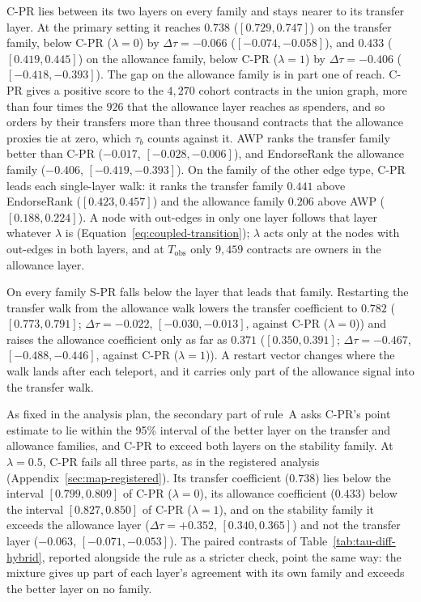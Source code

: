 

\mbox{C-PR} lies between its two layers on every family and stays nearer to its transfer layer. At the primary setting it reaches $0.738$ ($[0.729,0.747]$) on the transfer family, below \mbox{C-PR} ($\lambda=0$) by $\Delta\tau=-0.066$ ($[-0.074,-0.058]$), and $0.433$ ($[0.419,0.445]$) on the allowance family, below \mbox{C-PR} ($\lambda=1$) by $\Delta\tau=-0.406$ ($[-0.418,-0.393]$). The gap on the allowance family is in part one of reach. \mbox{C-PR} gives a positive score to the $4{,}270$ cohort contracts in the union graph, more than four times the $926$ that the allowance layer reaches as spenders, and so orders by their transfers more than three thousand contracts that the allowance proxies tie at zero, which $\tau_b$ counts against it. AWP ranks the transfer family better than \mbox{C-PR} ($-0.017$, $[-0.028,-0.006]$), and EndorseRank the allowance family ($-0.406$, $[-0.419,-0.393]$). On the family of the other edge type, \mbox{C-PR} leads each single-layer walk: it ranks the transfer family $0.441$ above EndorseRank ($[0.423,0.457]$) and the allowance family $0.206$ above AWP ($[0.188,0.224]$). A node with out-edges in only one layer follows that layer whatever $\lambda$ is (Equation~\eqref{eq:coupled-transition}); $\lambda$ acts only at the nodes with out-edges in both layers, and at $T_{\mathrm{obs}}$ only $9{,}459$ contracts are owners in the allowance layer.

On every family \mbox{S-PR} falls below the layer that leads that family. Restarting the transfer walk from the allowance walk lowers the transfer coefficient to $0.782$ ($[0.773,0.791]$; $\Delta\tau=-0.022$, $[-0.030,-0.013]$, against \mbox{C-PR} ($\lambda=0$)) and raises the allowance coefficient only as far as $0.371$ ($[0.350,0.391]$; $\Delta\tau=-0.467$, $[-0.488,-0.446]$, against \mbox{C-PR} ($\lambda=1$)). A restart vector changes where the walk lands after each teleport, and it carries only part of the allowance signal into the transfer walk.

As fixed in the analysis plan, the secondary part of rule~A asks \mbox{C-PR}'s point estimate to lie within the 95\% interval of the better layer on the transfer and allowance families, and \mbox{C-PR} to exceed both layers on the stability family. At $\lambda=0.5$, \mbox{C-PR} fails all three parts, as in the registered analysis (Appendix~\ref{sec:map-registered}). Its transfer coefficient ($0.738$) lies below the interval $[0.799,0.809]$ of \mbox{C-PR} ($\lambda=0$), its allowance coefficient ($0.433$) below the interval $[0.827,0.850]$ of \mbox{C-PR} ($\lambda=1$), and on the stability family it exceeds the allowance layer ($\Delta\tau=+0.352$, $[0.340,0.365]$) and not the transfer layer ($-0.063$, $[-0.071,-0.053]$). The paired contrasts of Table~\ref{tab:tau-diff-hybrid}, reported alongside the rule as a stricter check, point the same way: the mixture gives up part of each layer's agreement with its own family and exceeds the better layer on no family.

